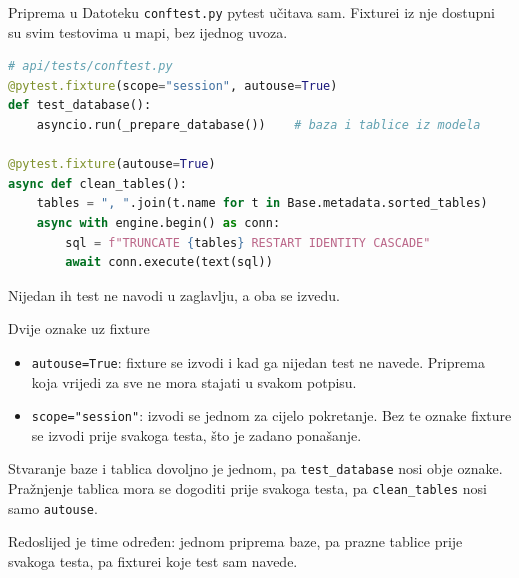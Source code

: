 \begin{frame}[fragile]{Priprema u }
Datoteku \texttt{conftest.py} pytest učitava sam. Fixturei iz nje dostupni su svim testovima u mapi, bez ijednog uvoza.

\begin{lstlisting}[language=python]
# api/tests/conftest.py
@pytest.fixture(scope="session", autouse=True)
def test_database():
    asyncio.run(_prepare_database())    # baza i tablice iz modela

@pytest.fixture(autouse=True)
async def clean_tables():
    tables = ", ".join(t.name for t in Base.metadata.sorted_tables)
    async with engine.begin() as conn:
        sql = f"TRUNCATE {tables} RESTART IDENTITY CASCADE"
        await conn.execute(text(sql))
\end{lstlisting}

\vspace{0.3em}
Nijedan ih test ne navodi u zaglavlju, a oba se izvedu.
\end{frame}

\begin{frame}{Dvije oznake uz fixture}
\begin{itemize}
  \itemsep0.7em
  \item \texttt{autouse=True}: fixture se izvodi i kad ga nijedan test ne navede. Priprema koja vrijedi za sve ne mora stajati u svakom potpisu.
  \item \texttt{scope="session"}: izvodi se jednom za cijelo pokretanje. Bez te oznake fixture se izvodi prije svakoga testa, što je zadano ponašanje.
\end{itemize}

\vspace{1.1em}
Stvaranje baze i tablica dovoljno je jednom, pa \texttt{test\_database} nosi obje oznake. Pražnjenje tablica mora se dogoditi prije svakoga testa, pa \texttt{clean\_tables} nosi samo \texttt{autouse}.

\vspace{0.9em}
Redoslijed je time određen: jednom priprema baze, pa prazne tablice prije svakoga testa, pa fixturei koje test sam navede.
\end{frame}

